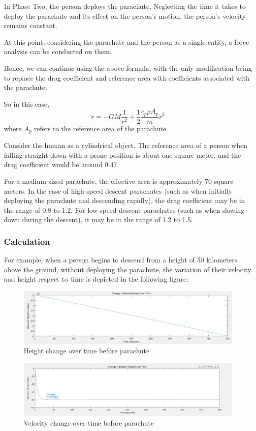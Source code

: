 \documentclass[12pt]{article}
\begin{document}
In Phase Two, the person deploys the parachute. Neglecting the time it takes 
to deploy the parachute and its effect on the person's motion, the person's 
velocity remains constant.

At this point, considering the parachute and the person as a single entity, 
a force analysis can be conducted on them.

Hence, we can continue using the above formula, with the only modification being to replace the drag coefficient 
and reference area with coefficients associated with the parachute.

So in this case, 
\[ \ddot{r} = - GM\frac{1}{r^2} + \frac{1}{2}\frac{c_p\rho A_p}{m}\dot{r}^2\]
where $A_p$ refers to the reference area of the parachute.

Consider the human as a cylindrical object. The reference area of a person when falling straight down with a prone position 
is about one square meter, 
and the drag coefficient would be around 0.47\cite{enwiki:1160706380}.

For a medium-sized parachute, the effective area is approximately 70 square meters. 
In the case of high-speed descent parachutes (such as when initially deploying the parachute and 
descending rapidly), the drag coefficient may be in the range of 0.8 to 1.2. 
For low-speed descent parachutes (such as when slowing down during the descent), 
it may be in the range of 1.2 to 1.5.

\subsubsection{Calculation}
For example, when a person begins to descend from a height of 50 kilometers above the ground, without deploying the parachute, 
the variation of their velocity and height respect to time is depicted in the following figure:

\begin{figure}[!hbtp]
    \centering
    \includegraphics[width = 0.7\linewidth]{image/001.png}
    \caption{Height change over time before parachute}
\end{figure}
\begin{figure}[!hbtp]
    \centering
    \includegraphics[width = 0.7\linewidth]{image/002.png}
    \caption{Velocity change over time before parachute}
\end{figure}
\end{document}
